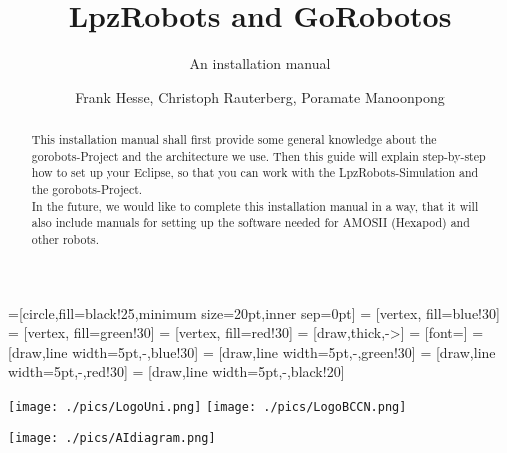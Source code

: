 \documentclass[a4paper,10pt]{scrartcl}
\title{LpzRobots and GoRobotos}
\subtitle{An installation manual}
\author{Frank Hesse, Christoph Rauterberg, Poramate Manoonpong}
\begin{document}
 =[circle,fill=black!25,minimum size=20pt,inner sep=0pt]
  = [vertex, fill=blue!30]
  = [vertex, fill=green!30]
  = [vertex, fill=red!30]
  = [draw,thick,->]
  = [font=\small]
  = [draw,line width=5pt,-,blue!30]
  = [draw,line width=5pt,-,green!30]
  = [draw,line width=5pt,-,red!30]
  = [draw,line width=5pt,-,black!20]
\renewcommand{\emph}[1]{\textcolor{blue}{#1}}
\newcommand{\remph}[1]{\textcolor{red}{#1}}


\maketitle

\begin{center}
\texttt{[image: ./pics/LogoUni.png]} %
 \texttt{[image: ./pics/LogoBCCN.png]}\\ %
\end{center}

\begin{abstract}
This installation manual shall first provide some general knowledge about the gorobots-Project and
the architecture we use. Then this guide will explain step-by-step how to set up
your Eclipse, so that you can work with the LpzRobots-Simulation and the gorobots-Project. \\
In the future, we would like to complete this installation manual in a way, that it will also include manuals for setting up the software needed for AMOSII (Hexapod) and other robots.
\end{abstract}

\begin{center}
\texttt{[image: ./pics/AIdiagram.png]}
\end{center}


\thispagestyle{empty}
\newpage
\thispagestyle{empty}
\tableofcontents


\newpage
\pagestyle{fancy} %
\fancyhf{} %
\renewcommand{\headrulewidth}{0pt}









\end{document}
